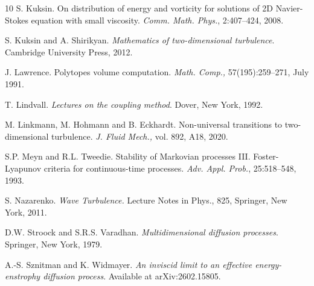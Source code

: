 \documentclass[12pt,leqno]{article}
\begin{document}
\begin{thebibliography}{10}
 S. Kuksin. On distribution of energy and vorticity for solutions of 2D Navier-Stokes equation with small viscosity. {\it Comm. Math. Phys.}, 2:407--424, 2008.

 S. Kuksin and A. Shirikyan. {\it Mathematics of two-dimensional turbulence}.  Cambridge University Press, 2012.

 J. Lawrence. Polytopes volume computation.  {\it Math. Comp.,} 57(195):259--271, July 1991.

 T. Lindvall. {\it Lectures on the coupling method}.  Dover, New York, 1992.

 M. Linkmann, M. Hohmann and B. Eckhardt. Non-universal transitions to two-dimensional turbulence. {\it J. Fluid Mech.,} vol. 892, A18, 2020.

 S.P. Meyn and R.L. Tweedie. Stability of Markovian processes III. Foster-Lyapunov criteria for continuous-time processes.  {\it Adv. Appl. Prob.}, 25:518--548, 1993.

 S. Nazarenko. {\it Wave Turbulence.} Lecture Notes in Phys., 825, Springer, New York, 2011.


 D.W. Stroock and S.R.S. Varadhan. {\it Multidimensional diffusion processes}.  Springer, New York, 1979.

 A.-S. Sznitman and K. Widmayer. {\it An inviscid limit to an effective energy-enstrophy diffusion process}. Available at arXiv:2602.15805.
\end{thebibliography}
\end{document}
